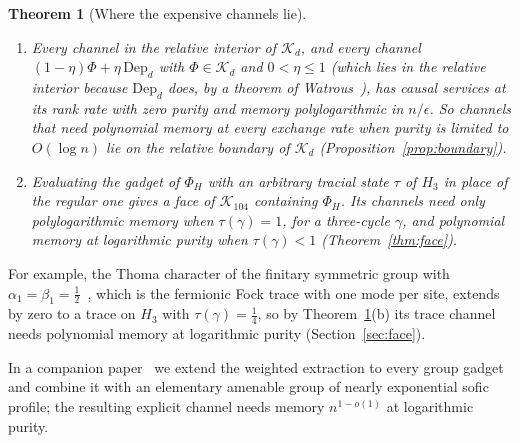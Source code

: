 \documentclass[11pt,a4paper]{article}
\theoremstyle{plain}
\newtheorem{mainthm}{Theorem}
\theoremstyle{definition}
\theoremstyle{remark}
\begin{document}
\begin{mainthm}[Where the expensive channels lie]\label{thm:where-intro}
\leavevmode
\begin{enumerate}[label=(\alph*)]
\item Every channel in the relative interior of $\mathcal K_d$, and every channel $(1-\eta)\Phi+\eta\,\mathrm{Dep}_d$ with $\Phi\in\mathcal K_d$ and
$0<\eta\le1$ (which lies in the relative interior because $\mathrm{Dep}_d$ does, by a theorem of Watrous~\cite[Corollary~2]{Watrous2009}), has
causal services at its rank rate with zero purity and memory polylogarithmic in $n/\epsilon$. So channels that need polynomial memory at every exchange rate when purity is
limited to $O(\log n)$ lie on the relative boundary of $\mathcal K_d$ (Proposition~\ref{prop:boundary}).
\item Evaluating the gadget of $\Phi_H$ with an arbitrary tracial state $\tau$ of $H_3$ in place of the regular one gives a face of
$\mathcal K_{104}$ containing $\Phi_H$. Its channels need only polylogarithmic memory when $\tau(\gamma)=1$, for a three-cycle $\gamma$, and
polynomial memory at logarithmic purity when $\tau(\gamma)<1$ (Theorem~\ref{thm:face}).
\end{enumerate}
\end{mainthm}

For example, the Thoma character of the finitary symmetric group with $\alpha_1=\beta_1=\frac12$~\cite{Thoma1964}, which is the fermionic
Fock trace with one mode per site, extends by zero to a trace on $H_3$ with $\tau(\gamma)=\frac14$, so by Theorem~\ref{thm:where-intro}(b) its trace channel needs
polynomial memory at logarithmic purity (Section~\ref{sec:face}).

In a companion paper~\cite{DouglasMghirbiC} we extend the weighted extraction to every group gadget and
combine it with an elementary amenable group of nearly exponential sofic profile; the resulting explicit channel needs memory $n^{1-o(1)}$ at
logarithmic purity.
\end{document}
